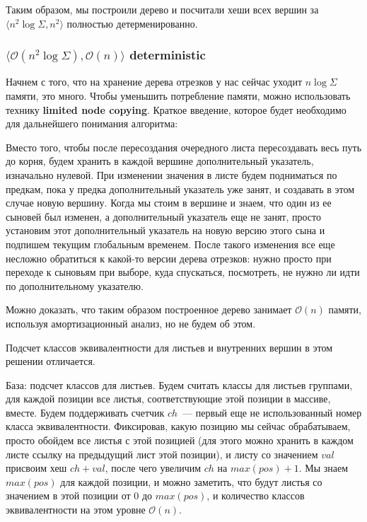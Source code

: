 Таким образом, мы построили дерево и посчитали хеши всех вершин за $\langle n^2 \log \Sigma, n^2 \rangle$ полностью детерменированно.


\subsubsection{$\langle \mathcal{O}(n^2 \log \Sigma), \mathcal{O}(n) \rangle$ deterministic}

Начнем с того, что на хранение дерева отрезков у нас сейчас уходит $n \log \Sigma$ памяти, это много. Чтобы уменьшить потребление памяти, можно использовать технику \textbf{limited node copying}. Краткое введение, которое будет необходимо для дальнейшего понимания алгоритма: %

Вместо того, чтобы после пересоздания очередного листа пересоздавать весь путь до корня, будем хранить в каждой вершине дополнительный указатель, изначально нулевой. При изменении значения в листе будем подниматься по предкам, пока у предка дополнительный указатель уже занят, и создавать в этом случае новую вершину. Когда мы стоим в вершине и знаем, что один из ее сыновей был изменен, а дополнительный указатель еще не занят, просто установим этот дополнительный указатель на новую версию этого сына и подпишем текущим глобальным временем. После такого изменения все еще несложно обратиться к какой-то версии дерева отрезков: нужно просто при переходе к сыновьям при выборе, куда спускаться, посмотреть, не нужно ли идти по дополнительному указателю.

Можно доказать, что таким образом построенное дерево занимает $\mathcal{O}(n)$ памяти, используя амортизационный анализ, но не будем об этом. 

Подсчет классов эквивалентности для листьев и внутренних вершин в этом решении отличается.

База: подсчет классов для листьев. Будем считать классы для листьев группами, для каждой позиции все листья, соответствующие этой позиции в массиве, вместе. Будем поддерживать счетчик $ch$~--- первый еще не использованный номер класса эквивалентности. Фиксировав, какую позицию мы сейчас обрабатываем, просто обойдем все листья с этой позицией (для этого можно хранить в каждом листе ссылку на предыдущий лист этой позиции), и листу со значением $val$ присвоим хеш $ch+val$, после чего увеличим $ch$ на $max(pos)+1$. Мы знаем $max(pos)$ для каждой позиции, и можно заметить, что будут листья со значением в этой позиции от $0$ до $max(pos)$, и количество классов эквивалентности на этом уровне $\mathcal{O}(n)$.

